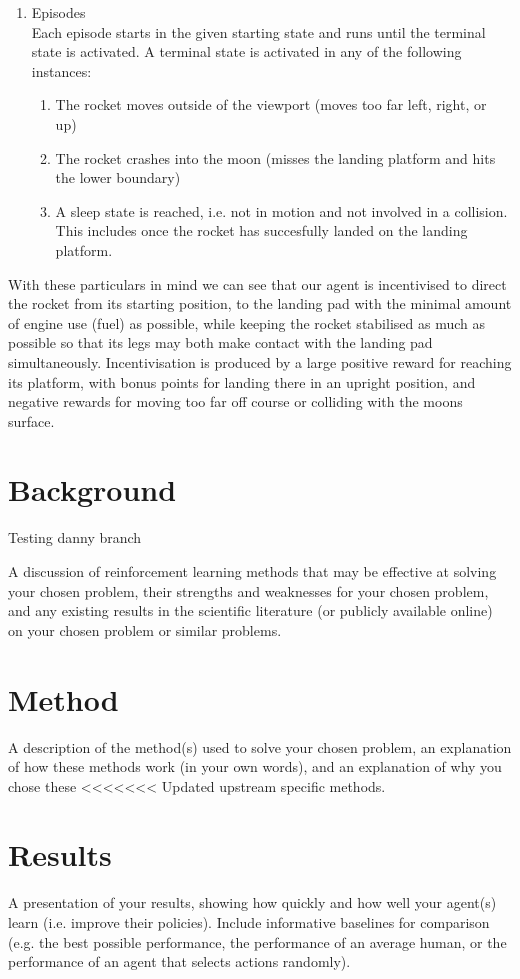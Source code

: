 \documentclass{article}
\begin{document}
\begin{enumerate}
  \item Episodes\\
  Each episode starts in the given starting state and runs until the terminal state is activated. A terminal state is activated in any of the following instances:
  \begin{enumerate}
    \item The rocket moves outside of the viewport (moves too far left, right, or up)
    \item The rocket crashes into the moon (misses the landing platform and hits the lower boundary)
    \item A sleep state is reached, i.e. not in motion and not involved in a collision. This includes once the rocket has succesfully landed on the landing platform.
  \end{enumerate}
\end{enumerate}

With these particulars in mind we can see that our agent is incentivised to direct the rocket from its starting position, to the landing pad with the minimal amount of engine use (fuel) as possible, while keeping the rocket stabilised as much as possible so that its legs may both make contact with the landing pad simultaneously. Incentivisation is produced by a large positive reward for reaching its platform, with bonus points for landing there in an upright position, and negative rewards for moving too far off course or colliding with the moons surface.


\section{Background}

Testing danny branch

A discussion of reinforcement learning methods that may be effective at solving
your chosen problem, their strengths and weaknesses for your chosen problem, and any existing
results in the scientific literature (or publicly available online) on your chosen problem or
similar problems.

\section{Method}
A description of the method(s) used to solve your chosen problem, an explanation
of how these methods work (in your own words), and an explanation of why you chose these
<<<<<<< Updated upstream
specific methods.

\section{Results}
A presentation of your results, showing how quickly and how well your agent(s)
learn (i.e. improve their policies). Include informative baselines for comparison (e.g. the best
possible performance, the performance of an average human, or the performance of an agent
that selects actions randomly).
\end{document}
